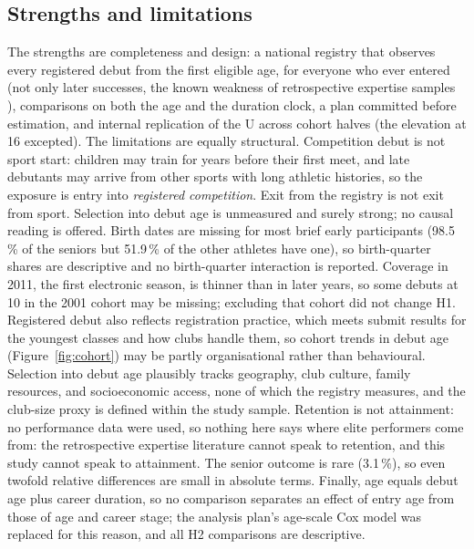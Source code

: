 \documentclass[12pt,a4paper]{article}
\begin{document}
\subsection{Strengths and limitations}

The strengths are completeness and design: a national registry that observes every registered debut from the first eligible age, for everyone who ever entered (not only later successes, the known weakness of retrospective expertise samples \cite{barth2022,gullich2025}), comparisons on both the age and the duration clock, a plan committed before estimation, and internal replication of the U across cohort halves (the elevation at 16 excepted). The limitations are equally structural. Competition debut is not sport start: children may train for years before their first meet, and late debutants may arrive from other sports with long athletic histories, so the exposure is entry into \emph{registered competition}. Exit from the registry is not exit from sport. Selection into debut age is unmeasured and surely strong; no causal reading is offered. Birth dates are missing for most brief early participants (98.5\,\% of the seniors but 51.9\,\% of the other athletes have one), so birth-quarter shares are descriptive and no birth-quarter interaction is reported. Coverage in 2011, the first electronic season, is thinner than in later years, so some debuts at 10 in the 2001 cohort may be missing; excluding that cohort did not change H1. Registered debut also reflects registration practice, which meets submit results for the youngest classes and how clubs handle them, so cohort trends in debut age (Figure~\ref{fig:cohort}) may be partly organisational rather than behavioural. Selection into debut age plausibly tracks geography, club culture, family resources, and socioeconomic access, none of which the registry measures, and the club-size proxy is defined within the study sample. Retention is not attainment: no performance data were used, so nothing here says where elite performers come from: the retrospective expertise literature cannot speak to retention, and this study cannot speak to attainment. The senior outcome is rare (3.1\,\%), so even twofold relative differences are small in absolute terms. Finally, age equals debut age plus career duration, so no comparison separates an effect of entry age from those of age and career stage; the analysis plan's age-scale Cox model was replaced for this reason, and all H2 comparisons are descriptive.

\end{document}
